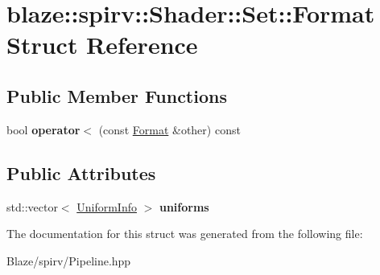 \hypertarget{structblaze_1_1spirv_1_1Shader_1_1Set_1_1Format}{}\section{blaze\+:\+:spirv\+:\+:Shader\+:\+:Set\+:\+:Format Struct Reference}
\label{structblaze_1_1spirv_1_1Shader_1_1Set_1_1Format}
\subsection*{Public Member Functions}
\begin{DoxyCompactItemize}
\item 
\mbox{\label{structblaze_1_1spirv_1_1Shader_1_1Set_1_1Format_a8e92dcaeb1fbf5b471a8efe2307185eb}} 
bool {\bfseries operator$<$} (const \hyperlink{structblaze_1_1spirv_1_1Shader_1_1Set_1_1Format}{Format} \&other) const
\end{DoxyCompactItemize}
\subsection*{Public Attributes}
\begin{DoxyCompactItemize}
\item 
\mbox{\label{structblaze_1_1spirv_1_1Shader_1_1Set_1_1Format_afc9fe2b5c8468a44d40ffe9dfc32c6f9}} 
std\+::vector$<$ \hyperlink{structblaze_1_1spirv_1_1UniformInfo}{Uniform\+Info} $>$ {\bfseries uniforms}
\end{DoxyCompactItemize}


The documentation for this struct was generated from the following file\+:\begin{DoxyCompactItemize}
\item 
Blaze/spirv/Pipeline.\+hpp\end{DoxyCompactItemize}
